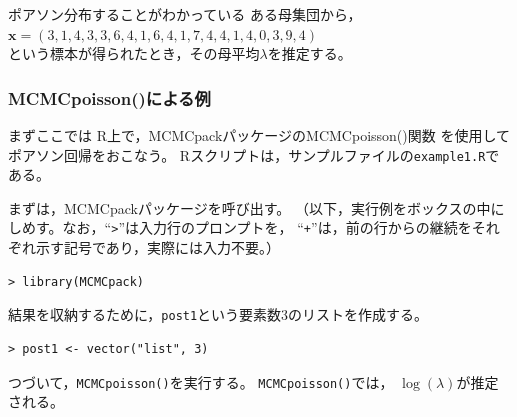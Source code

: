 \documentclass[11pt,uplatex]{jsarticle}
\begin{document}
\hspace{18mm}
\begin{minipage}{100mm}
\begin{breakbox}
ポアソン分布することがわかっている ある母集団から，\\
\hspace{10mm} $\bm{x} = (3, 1, 4, 3, 3, 6, 4, 1, 6, 4, 
       1, 7, 4, 4, 1, 4, 0, 3, 9, 4)$\\
という標本が得られたとき，その母平均$\lambda$を推定する。
\end{breakbox}
\end{minipage}

\vspace{1zw}

\subsubsection{MCMCpoisson()による例}

まずここでは \textsf{R}上で，\textsf{MCMCpack}パッケージの\textsf{MCMCpoisson()}関数
を使用してポアソン回帰をおこなう。
\textsf{R}スクリプトは，サンプルファイルの\texttt{example1.R}である。
\vspace{1zw}

まずは，\textsf{MCMCpack}パッケージを呼び出す。
（以下，実行例をボックスの中にしめす。なお，``\texttt{>}''は入力行のプロンプトを，
``\texttt{+}''は，前の行からの継続をそれぞれ示す記号であり，実際には入力不要。）

\begin{lstlisting}
> library(MCMCpack)
\end{lstlisting}
%
結果を収納するために，\texttt{post1}という要素数3のリストを作成する。

\begin{lstlisting}
> post1 <- vector("list", 3)
\end{lstlisting}
%
つづいて，\texttt{MCMCpoisson()}を実行する。
\texttt{MCMCpoisson()}では，
$\log(\lambda)$が推定される。
\end{document}
